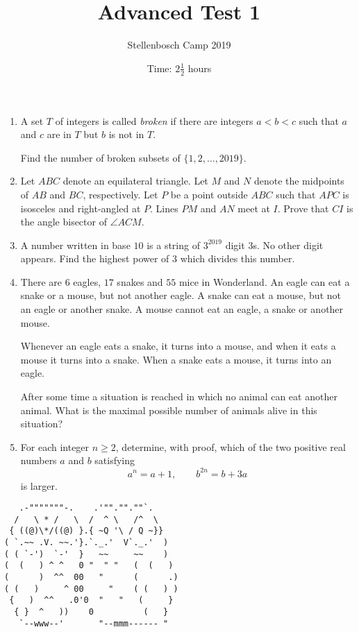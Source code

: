 \documentclass{article}
\title{Advanced Test 1}
\author{Stellenbosch Camp 2019}
\date{Time: $2\frac{1}{2}$ hours}
\begin{document}
\maketitle
\thispagestyle{empty}


\begin{enumerate}[1.]

\item %
A set $T$ of integers is called \emph{broken} if there are integers $a < b < c$ such that $a$ and $c$ are in $T$ but $b$ is not in $T$.

Find the number of broken subsets of $\{1, 2, \dotsc, 2019\}$.


\item %
Let $ABC$ denote an equilateral triangle.
Let $M$ and $N$ denote the midpoints of $AB$ and $BC$, respectively.
Let $P$ be a point outside $ABC$ such that $APC$ is isosceles and right-angled at $P$.
Lines $PM$ and $AN$ meet at $I$.
Prove that $CI$ is the angle bisector of $\angle ACM$.


\item %
A number written in base $10$ is a string of $3^{2019}$ digit $3$s.
No other digit appears.
Find the highest power of $3$ which divides this number.


\item %
There are $6$ eagles, $17$ snakes and $55$ mice in Wonderland.
An eagle can eat a snake or a mouse, but not another eagle.
A snake can eat a mouse, but not an eagle or another snake.
A mouse cannot eat an eagle, a snake or another mouse.

Whenever an eagle eats a snake, it turns into a mouse, and when it eats a mouse it turns into a snake. When a snake eats a mouse, it turns into an eagle.

After some time a situation is reached in which no animal can eat another animal.
What is the maximal possible number of animals alive in this situation?


\item %
For each integer $n \geq 2$, determine, with proof, which of the two positive real numbers $a$ and $b$ satisfying
\[ a^n = a+1, \qquad b^{2n} = b+3a \]
is larger.

\end{enumerate}


\vfill
\centering
\begin{BVerbatim}
   .-"""""""-.    .'""."".""`.
  /   \ * /   \  /  ^ \   /^  \
 { ((@)\*/((@) }.{ ~Q '\ / Q ~}}
( `.~~ .V. ~~.'}.`._.'  V`._.'  )
( ( `-')  `-'  }   ~~     ~~    )
(  (   ) ^ ^   0 "  " "   (  (   )
(      )  ^^  00   "      (      .)
( (   )     ^ 00     "    ( (   ) )
 {   )  ^^   .0'0  "   "   (     }
  { }  ^   ))    0          (   }
   `--www--'       "--mmm------ "    
\end{BVerbatim}
\end{document}
